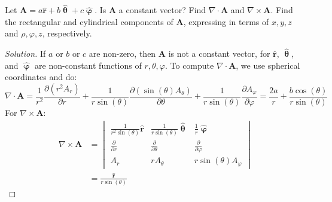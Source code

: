 \documentclass[crop=false,class=article,oneside]{standalone}
\begin{document}
        \begin{problem}[Wangsness 1-20]
            Let
            $\mathbf{A}%
             =a\hat{\mathbf{r}}%
             +b\hat{\boldsymbol{\uptheta}}%
             +c\hat{\boldsymbol{\upvarphi}}$.
            Is $\mathbf{A}$ a constant vector? Find
            $\nabla\cdot\mathbf{A}$ and
            $\nabla\times\mathbf{A}$. Find the rectangular
            and cylindrical components of $\mathbf{A}$,
            expressing in terms of $x,y,z$ and
            $\rho,\varphi,z$, respectively.
        \end{problem}
        \begin{proof}[Solution]
            If $a$ or $b$ or $c$ are non-zero,
            then $\mathbf{A}$ is not a constant
            vector, for $\hat{\mathbf{r}}$,
            $\hat{\boldsymbol{\uptheta}}$, and
            $\hat{\boldsymbol{\upvarphi}}$ are
            non-constant functions of $r,\theta,\varphi$.
            To compute $\nabla\cdot\mathbf{A}$,
            we use spherical coordinates and do:
            \begin{equation*}
                \nabla\cdot\mathbf{A}
                =\frac{1}{r^{2}}
                \frac{\partial(r^{2}A_{r})}{\partial{r}}
                +\frac{1}{r\sin(\theta)}
                \frac{\partial(\sin(\theta)A_{\theta})}
                     {\partial\theta}
                +\frac{1}{r\sin(\theta)}
                \frac{\partial A_{\varphi}}{\partial\varphi}
                =\frac{2a}{r}
                +\frac{b\cos(\theta)}{r\sin(\theta)}
            \end{equation*}
            For $\nabla\times\mathbf{A}$:
            \begin{align*}
                \nabla\times\mathbf{A}
                &=
                \begin{vmatrix}
                    \frac{1}{r^{2}\sin(\theta)}\hat{\mathbf{r}}
                    &\frac{1}{r\sin(\theta)}\hat{\boldsymbol{\uptheta}}
                    &\frac{1}{r}\hat{\boldsymbol{\upvarphi}}\\
                    \frac{\partial}{\partial{r}}
                    &\frac{\partial}{\partial\theta}
                    &\frac{\partial}{\partial\varphi}\\
                    A_{r}
                    &rA_{\theta}
                    &r\sin(\theta)A_{\varphi}
                \end{vmatrix}\\
                &=\frac{\hat{\mathbf{r}}}{r\sin(\theta)}

\end{align*}
\end{proof}
\end{document}
